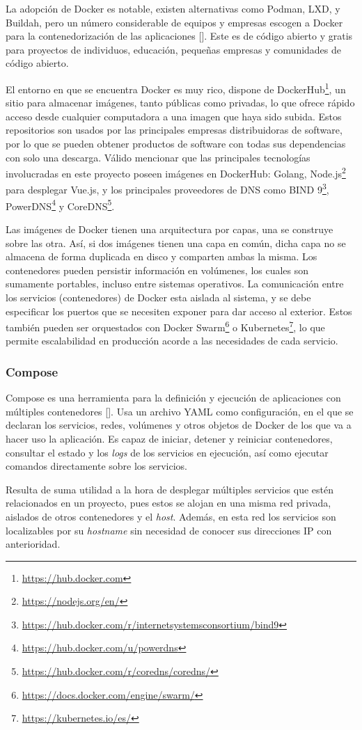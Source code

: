 La adopción de Docker es notable, existen alternativas como Podman, LXD, y Buildah, pero un número considerable de equipos y empresas escogen a Docker para la contenedorización de las aplicaciones [\cite{docker-usage}]. Este es de código abierto y gratis para proyectos de individuos, educación, pequeñas empresas y comunidades de código abierto.

El entorno en que se encuentra Docker es muy rico, dispone de DockerHub\footnote{\url{https://hub.docker.com}}, un sitio para almacenar imágenes, tanto públicas como privadas, lo que ofrece rápido acceso desde cualquier computadora a una imagen que haya sido subida. Estos repositorios son usados por las principales empresas distribuidoras de software, por lo que se pueden obtener productos de software con todas sus dependencias con solo una descarga. Válido mencionar que las principales tecnologías involucradas en este proyecto poseen imágenes en DockerHub: Golang, Node.js\footnote{\url{https://nodejs.org/en/}} para desplegar Vue.js, y los principales proveedores de DNS como BIND 9\footnote{\url{https://hub.docker.com/r/internetsystemsconsortium/bind9}}, PowerDNS\footnote{\url{https://hub.docker.com/u/powerdns}} y CoreDNS\footnote{\url{https://hub.docker.com/r/coredns/coredns/}}.

Las imágenes de Docker tienen una arquitectura por capas, una se construye sobre las otra. Así, si dos imágenes tienen una capa en común, dicha capa no se almacena de forma duplicada en disco y comparten ambas la misma. Los contenedores pueden persistir información en volúmenes, los cuales son sumamente portables, incluso entre sistemas operativos. La comunicación entre los servicios (contenedores) de Docker esta aislada al sistema, y se debe especificar los puertos que se necesiten exponer para dar acceso al exterior. Estos también pueden ser orquestados con Docker Swarm\footnote{\url{https://docs.docker.com/engine/swarm/}} o Kubernetes\footnote{\url{https://kubernetes.io/es/}}, lo que permite escalabilidad en producción acorde a las necesidades de cada servicio.

\subsubsection{Compose}

Compose es una herramienta para la definición y ejecución de aplicaciones con múltiples contenedores [\cite{docker-compose}]. Usa un archivo YAML como configuración, en el que se declaran los servicios, redes, volúmenes y otros objetos de Docker de los que va a hacer uso la aplicación. Es capaz de iniciar, detener y reiniciar contenedores, consultar el estado y los \textit{logs} de los servicios en ejecución, así como ejecutar comandos directamente sobre los servicios.      

Resulta de suma utilidad a la hora de desplegar múltiples servicios que estén relacionados en un proyecto, pues estos se alojan en una misma red privada, aislados de otros contenedores y el \textit{host}. Además, en esta red los servicios son localizables por su \textit{hostname} sin necesidad de conocer sus direcciones IP con anterioridad.

